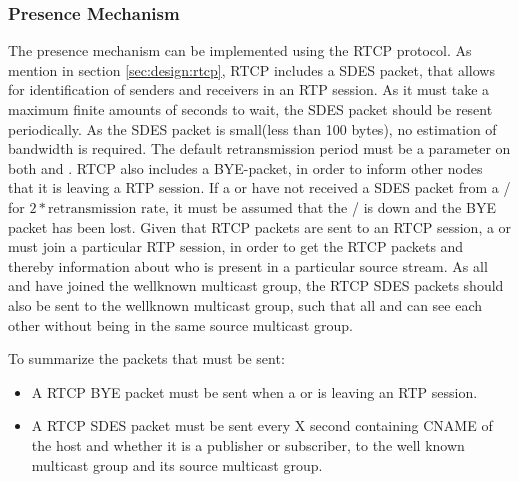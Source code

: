 \subsubsection{Presence Mechanism} \label{sec:design:presencemechanism}
The presence mechanism can be implemented using the RTCP protocol. As mention in section \ref{sec:design:rtcp}, RTCP includes a SDES packet, that allows for identification of senders and receivers in an RTP session.
As it must take a maximum finite amounts of seconds to wait, the SDES  packet should be resent periodically. As the SDES packet is small(less than 100 bytes), no estimation of bandwidth is required. The default retransmission period must be a parameter on both \sub{} and \pub{}. RTCP also includes a BYE-packet, in order to inform other nodes that it is leaving a RTP session.
If a  or  have not received a SDES packet from a / for $2*\text{retransmission rate}$, it must be assumed that the / is down and the BYE packet has been lost.
Given that RTCP packets are sent to an RTCP session, a \sub{} or \pub{} must join a particular RTP session, in order to get the RTCP packets and thereby information about who is present in a particular source stream. As all \pubs{} and \subs{} have joined the wellknown multicast group, the RTCP SDES packets should also be sent to the wellknown multicast group, such that all \pubs{} and \subs{} can see each other without being in the same source multicast group.

To summarize the packets that must be sent:
\begin{itemize}
	\item A RTCP BYE packet must be sent when a \sub or \pub is leaving an RTP session.
	\item A RTCP SDES packet must be sent every X second containing CNAME of the host and whether it is a publisher or subscriber, to the well known multicast group and its source multicast group.
\end{itemize}





